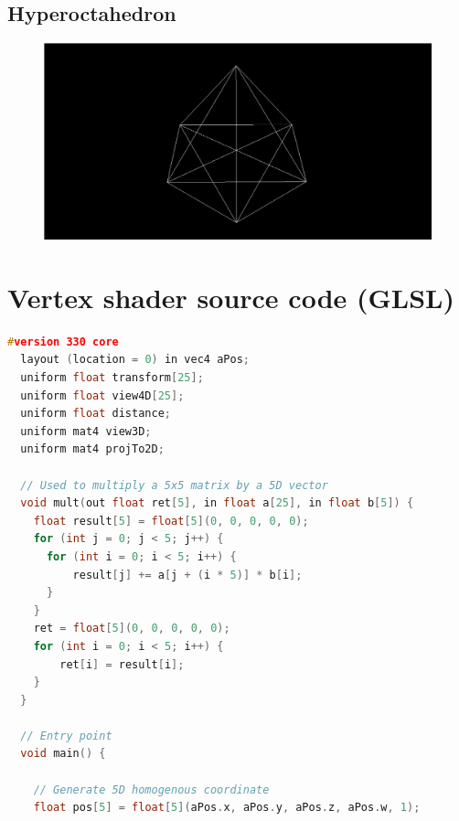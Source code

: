 \documentclass[11pt, a4paper]{article}
\begin{document}
\begin{appendices}


\pagebreak
\subsection*{Hyperoctahedron}

\begin{figure}[!h]
  \centering
  \includegraphics[width=\textwidth]{img/hyperoctahedron.png}
\end{figure}



\pagebreak
\section{Vertex shader source code (GLSL)}
\label{app:vertexShader}

\begin{lstlisting}[language=c++]
  #version 330 core
  layout (location = 0) in vec4 aPos;
  uniform float transform[25];
  uniform float view4D[25];
  uniform float distance;
  uniform mat4 view3D;
  uniform mat4 projTo2D;
  
  // Used to multiply a 5x5 matrix by a 5D vector
  void mult(out float ret[5], in float a[25], in float b[5]) {
    float result[5] = float[5](0, 0, 0, 0, 0);
    for (int j = 0; j < 5; j++) {
      for (int i = 0; i < 5; i++) {
          result[j] += a[j + (i * 5)] * b[i];
      }
    }
    ret = float[5](0, 0, 0, 0, 0);
    for (int i = 0; i < 5; i++) {
        ret[i] = result[i];
    }
  }
  
  // Entry point
  void main() {

    // Generate 5D homogenous coordinate
    float pos[5] = float[5](aPos.x, aPos.y, aPos.z, aPos.w, 1);


\end{lstlisting}
\end{appendices}
\end{document}
